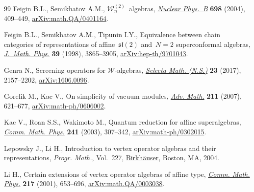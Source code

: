\documentclass[11pt]{article}
\numberwithin{equation}{section}
\begin{document}
\begin{thebibliography}{99}
Feigin B.L., Semikhatov A.M., {$\mathcal W^{(2)}_n$}~algebras,
 \href{https://doi.org/10.1016/j.nuclphysb.2004.06.056}{\textit{Nuclear
 Phys.~B}} \textbf{698} (2004), 409--449,
 \href{http://arxiv.org/abs/math.QA/0401164}{arXiv:math.QA/0401164}.

Feigin B.L., Semikhatov A.M., Tipunin I.Y., Equivalence between chain
 categories of representations of affine~{$\mathfrak{sl}(2)$} and~{$N=2$}
 superconformal algebras,
 \href{https://doi.org/10.1063/1.532473}{\textit{J.~Math. Phys.}} \textbf{39}
 (1998), 3865--3905,
 \href{http://arxiv.org/abs/hep-th/9701043}{arXiv:hep-th/9701043}.

Genra N., Screening operators for {$\mathcal{W}$}-algebras,
 \href{https://doi.org/10.1007/s00029-017-0315-9}{\textit{Selecta Math.
 (N.S.)}} \textbf{23} (2017), 2157--2202,
 \href{http://arxiv.org/abs/1606.0096}{arXiv:1606.0096}.

Gorelik M., Kac V., On simplicity of vacuum modules,
 \href{https://doi.org/10.1016/j.aim.2006.09.004}{\textit{Adv. Math.}}
 \textbf{211} (2007), 621--677,
 \href{http://arxiv.org/abs/math-ph/0606002}{arXiv:math-ph/0606002}.

Kac V., Roan S.S., Wakimoto M., Quantum reduction for affine superalgebras,
 \href{https://doi.org/10.1007/s00220-003-0926-1}{\textit{Comm. Math. Phys.}}
 \textbf{241} (2003), 307--342,
 \href{http://arxiv.org/abs/math-ph/0302015}{arXiv:math-ph/0302015}.

Lepowsky J., Li H., Introduction to vertex operator algebras and their
 representations, \textit{Progr. Math.}, Vol.~227,
 \href{https://doi.org/10.1007/978-0-8176-8186-9}{Birkh\"auser}, Boston, MA,
 2004.

Li H., Certain extensions of vertex operator algebras of affine type,
 \href{https://doi.org/10.1007/s002200100386}{\textit{Comm. Math. Phys.}}
 \textbf{217} (2001), 653--696,
 \href{http://arxiv.org/abs/math.QA/0003038}{arXiv:math.QA/0003038}.

\end{thebibliography}
\end{document}
